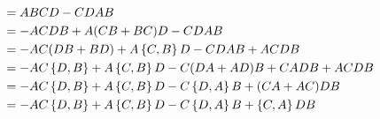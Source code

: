 \item

\begin{align*}
	[AB, CD]
	&= ABCD - CDAB \\
	&= -ACDB + A(CB + BC)D - CDAB \\
	&= -AC(DB+BD) + A\anticommutator{C}{B}D - CDAB + ACDB \\
	&= -AC\anticommutator{D}{B} + A\anticommutator{C}{B}D - C(DA + AD)B + CADB + ACDB \\
	&= -AC\anticommutator{D}{B} + A\anticommutator{C}{B}D - C\anticommutator{D}{A}B + (CA + AC)DB \\
	&= -AC\anticommutator{D}{B} + A\anticommutator{C}{B}D - C\anticommutator{D}{A}B + \anticommutator{C}{A}DB
\end{align*}
